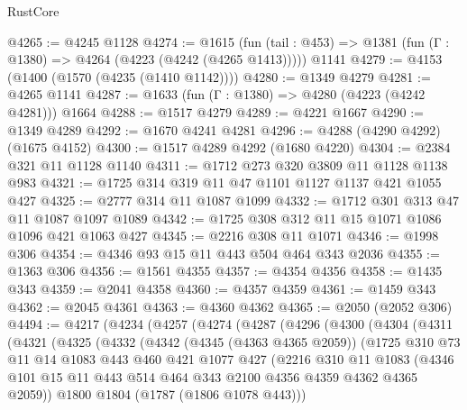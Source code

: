 \begin{lexlean}{RustCore}
\begin{coremodule}
@4265 := @4245 @1128
@4274 := @1615
    (fun (tail : @453) => @1381 (fun (Γ : @1380) => @4264 (@4223 (@4242 (@4265 @1413)))))
    @1141
@4279 := @4153 (@1400 (@1570 (@4235 (@1410 @1142))))
@4280 := @1349 @4279
@4281 := @4265 @1141
@4287 := @1633 (fun (Γ : @1380) => @4280 (@4223 (@4242 @4281))) @1664
@4288 := @1517 @4279
@4289 := @4221 @1667
@4290 := @1349 @4289
@4292 := @1670 @4241 @4281
@4296 := @4288 (@4290 @4292) (@1675 @4152)
@4300 := @1517 @4289 @4292 (@1680 @4220)
@4304 := @2384 @321 @11 @1128 @1140
@4311 := @1712 @273 @320 @3809 @11 @1128 @1138 @983
@4321 := @1725 @314 @319 @11 @47 @1101 @1127 @1137 @421 @1055 @427
@4325 := @2777 @314 @11 @1087 @1099
@4332 := @1712 @301 @313 @47 @11 @1087 @1097 @1089
@4342 := @1725 @308 @312 @11 @15 @1071 @1086 @1096 @421 @1063 @427
@4345 := @2216 @308 @11 @1071
@4346 := @1998 @306
@4354 := @4346 @93 @15 @11 @443 @504 @464 @343 @2036
@4355 := @1363 @306
@4356 := @1561 @4355
@4357 := @4354 @4356
@4358 := @1435 @343
@4359 := @2041 @4358
@4360 := @4357 @4359
@4361 := @1459 @343
@4362 := @2045 @4361
@4363 := @4360 @4362
@4365 := @2050 (@2052 @306)
@4494 := @4217
    (@4234
      (@4257
        (@4274
          (@4287
            (@4296
              (@4300
                (@4304
                  (@4311
                    (@4321
                      (@4325
                        (@4332
                          (@4342
                            (@4345 (@4363 @4365 @2059))
                            (@1725
                              @310
                              @73
                              @11
                              @14
                              @1083
                              @443
                              @460
                              @421
                              @1077
                              @427
                              (@2216
                                @310
                                @11
                                @1083
                                (@4346
                                  @101
                                  @15
                                  @11
                                  @443
                                  @514
                                  @464
                                  @343
                                  @2100
                                  @4356
                                  @4359
                                  @4362
                                  @4365
                                  @2059))
                              @1800
                              @1804
                              (@1787 (@1806 @1078 @443)))

\end{coremodule}
\end{lexlean}
